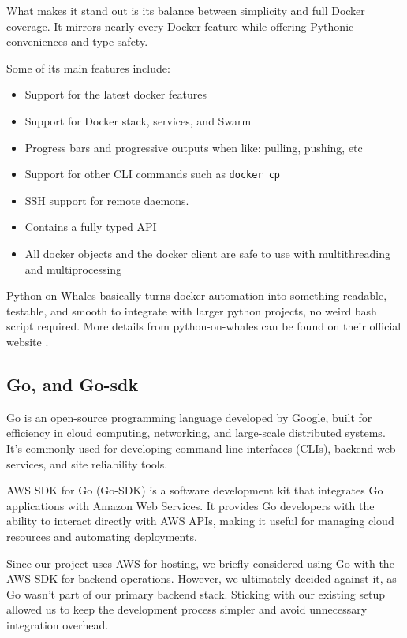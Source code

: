 \documentclass[12pt,titlepage]{article}
\begin{document}
What makes it stand out is its balance between simplicity and full Docker coverage. 
It mirrors nearly every Docker feature while offering Pythonic conveniences and type safety.

Some of its main features include:
\begin{itemize}
\item Support for the latest docker features
\item Support for Docker stack, services, and Swarm
\item Progress bars and progressive outputs when like: pulling, pushing, etc
\item Support for other CLI commands such as \texttt{docker cp}
\item SSH support for remote daemons.
\item Contains a fully typed API
\item All docker objects and the docker client are safe to use with multithreading and multiprocessing
\end{itemize}

Python-on-Whales basically turns docker automation into something readable, testable, and smooth to
integrate with larger python projects, no weird bash script required.
More details from python-on-whales can be found on their official website \cite{pythononwhales}.

\subsection{Go, and Go-sdk}
Go is an open-source programming language developed by Google, built for efficiency in cloud computing, networking, and large-scale distributed systems.
It’s commonly used for developing command-line interfaces (CLIs), backend web services, and site reliability tools.

AWS SDK for Go (Go-SDK) is a software development kit that integrates Go applications with Amazon Web Services.
It provides Go developers with the ability to interact directly with AWS APIs, making it useful for managing cloud resources and automating deployments.

Since our project uses AWS for hosting, we briefly considered using Go with the AWS SDK for backend operations.
However, we ultimately decided against it, as Go wasn’t part of our primary backend stack.
Sticking with our existing setup allowed us to keep the development process simpler and avoid unnecessary integration overhead.
\end{document}
